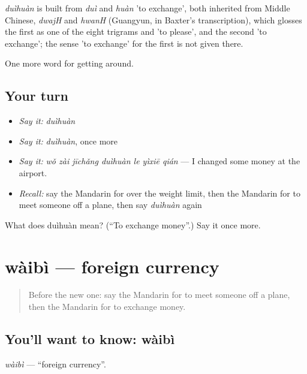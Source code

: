 \begin{cousinweb}
\emph{duìhuàn} is built from \emph{duì} and \emph{huàn} 'to exchange', both inherited from Middle Chinese, \emph{dwajH} and \emph{hwanH} (Guangyun, in Baxter's transcription), which glosses the first as one of the eight trigrams and 'to please', and the second 'to exchange'; the sense 'to exchange' for the first is not given there.
\end{cousinweb}

\begin{grammarlens}[title={What you've built}]
One more word for getting around.
\end{grammarlens}

\subsection*{Your turn}
\begin{itemize}
\raggedright
  \item \emph{Say it:} \emph{duìhuàn}
  \item \emph{Say it:} \emph{duìhuàn}, once more
  \item \emph{Say it:} \emph{wǒ zài jīchǎng duìhuàn le yìxiē qián} — I changed some money at the airport.
  \item \emph{Recall:} say the Mandarin for over the weight limit, then the Mandarin for to meet someone off a plane, then say \emph{duìhuàn} again
\end{itemize}

\begin{tcolorbox}[breakable,colback=teal!4,colframe=teal!35!black,title={Before you move on}]
What does duìhuàn mean? (\textquotedblleft{}To exchange money\textquotedblright{}.) Say it once more.
\end{tcolorbox}
\section[wàibì]{wàibì — foreign currency}

\label{lesson:ZH-C419-waibi}



\begin{quote}
Before the new one: say the Mandarin for to meet someone off a plane, then the Mandarin for to exchange money.
\end{quote}

\subsection*{You'll want to know: wàibì}
\emph{wàibì} — \textquotedblleft{}foreign currency\textquotedblright{}.


